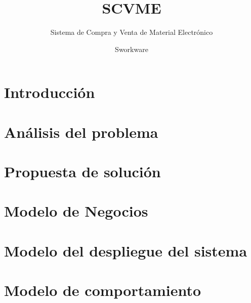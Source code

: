 \documentclass[oneside,10pt]{book}
\title{SCVME}
\subtitle{Sistema de Compra y Venta de Material Electrónico}
\author{Sworkware}
\begin{document}
\maketitle
\thispagestyle{empty}

\frontmatter
\tableofcontents

\mainmatter

\chapter{Introducción}


\chapter{Análisis del problema}


\chapter{Propuesta de solución}




\chapter{Modelo de Negocios}


\chapter{Modelo del despliegue del sistema}

\chapter{Modelo de comportamiento}
	
\end{document}
